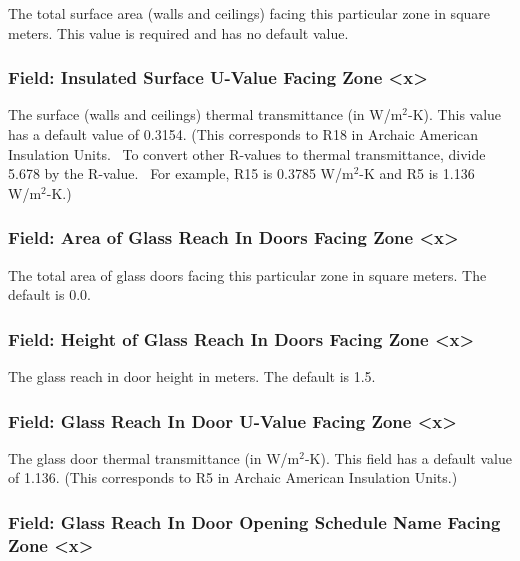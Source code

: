 The total surface area (walls and ceilings) facing this particular zone in square meters. This value is required and has no default value.

\subsubsection{Field: Insulated Surface U-Value Facing Zone \textless{}x\textgreater{}}\label{field-insulated-surface-u-value-facing-zone-x}

The surface (walls and ceilings) thermal transmittance (in W/m\(^{2}\)-K). This value has a default value of 0.3154. (This corresponds to R18 in Archaic American Insulation Units.~ To convert other R-values to thermal transmittance, divide 5.678 by the R-value.~ For example, R15 is 0.3785 W/m\(^{2}\)-K and R5 is 1.136 W/m\(^{2}\)-K.)

\subsubsection{Field: Area of Glass Reach In Doors Facing Zone \textless{}x\textgreater{}}\label{field-area-of-glass-reach-in-doors-facing-zone-x}

The total area of glass doors facing this particular zone in square meters. The default is 0.0.

\subsubsection{Field: Height of Glass Reach In Doors Facing Zone \textless{}x\textgreater{}}\label{field-height-of-glass-reach-in-doors-facing-zone-x}

The glass reach in door height in meters. The default is 1.5.

\subsubsection{Field: Glass Reach In Door U-Value Facing Zone \textless{}x\textgreater{}}\label{field-glass-reach-in-door-u-value-facing-zone-x}

The glass door thermal transmittance (in W/m\(^{2}\)-K). This field has a default value of 1.136. (This corresponds to R5 in Archaic American Insulation Units.)

\subsubsection{Field: Glass Reach In Door Opening Schedule Name Facing Zone \textless{}x\textgreater{}}\label{field-glass-reach-in-door-opening-schedule-name-facing-zone-x}

